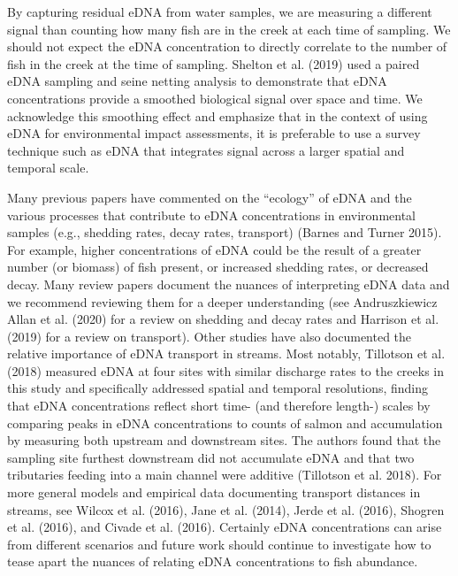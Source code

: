 \documentclass[
]{article}
\begin{document}
By capturing residual eDNA from water samples, we are measuring a
different signal than counting how many fish are in the creek at each
time of sampling. We should not expect the eDNA concentration to
directly correlate to the number of fish in the creek at the time of
sampling. Shelton et al. (2019) used a paired eDNA sampling and seine
netting analysis to demonstrate that eDNA concentrations provide a
smoothed biological signal over space and time. We acknowledge this
smoothing effect and emphasize that in the context of using eDNA for
environmental impact assessments, it is preferable to use a survey
technique such as eDNA that integrates signal across a larger spatial
and temporal scale.

Many previous papers have commented on the ``ecology'' of eDNA and the
various processes that contribute to eDNA concentrations in
environmental samples (e.g., shedding rates, decay rates, transport)
(Barnes and Turner 2015). For example, higher concentrations of eDNA
could be the result of a greater number (or biomass) of fish present, or
increased shedding rates, or decreased decay. Many review papers
document the nuances of interpreting eDNA data and we recommend
reviewing them for a deeper understanding (see Andruszkiewicz Allan et
al. (2020) for a review on shedding and decay rates and Harrison et al.
(2019) for a review on transport). Other studies have also documented
the relative importance of eDNA transport in streams. Most notably,
Tillotson et al. (2018) measured eDNA at four sites with similar
discharge rates to the creeks in this study and specifically addressed
spatial and temporal resolutions, finding that eDNA concentrations
reflect short time- (and therefore length-) scales by comparing peaks in
eDNA concentrations to counts of salmon and accumulation by measuring
both upstream and downstream sites. The authors found that the sampling
site furthest downstream did not accumulate eDNA and that two
tributaries feeding into a main channel were additive (Tillotson et al.
2018). For more general models and empirical data documenting transport
distances in streams, see Wilcox et al. (2016), Jane et al. (2014),
Jerde et al. (2016), Shogren et al. (2016), and Civade et al. (2016).
Certainly eDNA concentrations can arise from different scenarios and
future work should continue to investigate how to tease apart the
nuances of relating eDNA concentrations to fish abundance.
\end{document}
